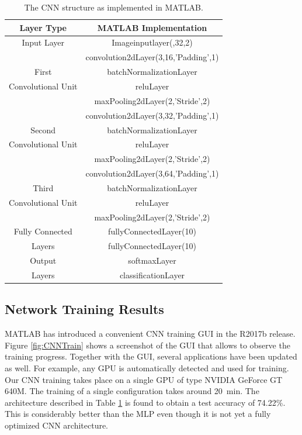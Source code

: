 \begin{table}[h]
	\begin{center}
		\begin{tabular}{||c | c||}
			\hline
			\textbf{Layer Type}& \textbf{MATLAB Implementation} \\ [0.5ex]
			\hline
			Input Layer& Imageinputlayer(\lbrack32,32,2\rbrack)\\
			\hline
			 & convolution2dLayer(3,16,'Padding',1) \\
			First& batchNormalizationLayer\\
			Convolutional Unit& reluLayer\\
			 & maxPooling2dLayer(2,'Stride',2)\\
			\hline
			 & convolution2dLayer(3,32,'Padding',1)\\
			Second& batchNormalizationLayer\\
			Convolutional Unit& reluLayer\\
			 & maxPooling2dLayer(2,'Stride',2)\\
			\hline
			 & convolution2dLayer(3,64,'Padding',1)\\
			Third& batchNormalizationLayer\\
			Convolutional Unit& reluLayer\\
			& maxPooling2dLayer(2,'Stride',2)\\
			\hline
			Fully Connected& fullyConnectedLayer(10)\\
			Layers& fullyConnectedLayer(10)\\
			\hline
			Output& softmaxLayer\\
			Layers& classificationLayer\\
			\hline

		\end{tabular}
		\caption{The CNN structure as implemented in MATLAB.}
		\label{Tab:CNNStructure}
	\end{center}
\end{table}
\FloatBarrier
\subsection{Network Training Results}

MATLAB has introduced a convenient CNN training GUI in the R2017b release. Figure \ref{fig:CNNTrain} shows a screenshot of the GUI that allows to observe the training progress. Together with the GUI, several applications have been updated as well. For example, any GPU is automatically detected and used for training. Our CNN training takes place on a single GPU of type NVIDIA GeForce GT 640M. The training of a single configuration takes around \SI{20}{\minute}. The architecture described in Table \ref{Tab:CNNStructure} is found to obtain a test accuracy of 74.22\%. This is considerably better than the MLP even though it is not yet a fully optimized CNN architecture.

